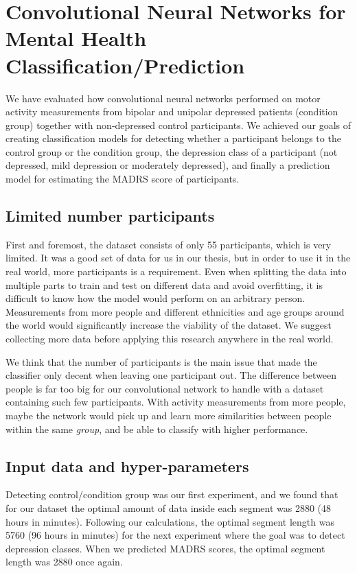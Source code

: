 \section{Convolutional Neural Networks for Mental Health Classification/Prediction}

We have evaluated how convolutional neural networks performed on motor activity measurements from bipolar and unipolar depressed patients (condition group) together with non-depressed control participants. We achieved our goals of creating classification models for detecting whether a participant belongs to the control group or the condition group, the depression class of a participant (not depressed, mild depression or moderately depressed), and finally a prediction model for estimating the MADRS score of participants. 

\subsection{Limited number participants}
First and foremost, the dataset consists of only 55 participants, which is very limited. It was a good set of data for us in our thesis, but in order to use it in the real world, more participants is a requirement. Even when splitting the data into multiple parts to train and test on different data and avoid overfitting, it is difficult to know how the model would perform on an arbitrary person. Measurements from more people and different ethnicities and age groups around the world would significantly increase the viability of the dataset. We suggest collecting more data before applying this research anywhere in the real world.
 
We think that the number of participants is the main issue that made the classifier only decent when leaving one participant out. The difference between people is far too big for our convolutional network to handle with a dataset containing such few participants. With activity measurements from more people, maybe the network would pick up and learn more similarities between people within the same \textit{group}, and be able to classify with higher performance. 

\subsection{Input data and hyper-parameters}
Detecting control/condition group was our first experiment, and we found that for our dataset the optimal amount of data inside each segment was 2880 (48 hours in minutes). Following our calculations, the optimal segment length was 5760 (96 hours in minutes) for the next experiment where the goal was to detect depression classes. When we predicted MADRS scores, the optimal segment length was 2880 once again. 

